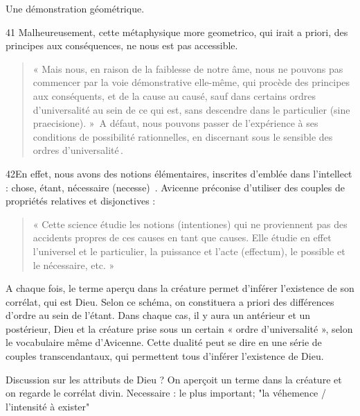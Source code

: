 \begin{Synthesis}
Une démonstration géométrique. 
\end{Synthesis}
41 Malheureusement, cette métaphysique more geometrico, qui irait a priori, des principes aux conséquences, ne nous est pas accessible.
\begin{quote}
     « Mais nous, en raison de la faiblesse de notre âme, nous ne pouvons pas commencer par la voie démonstrative elle-même, qui procède des principes aux conséquents, et de la cause au causé, sauf dans certains ordres d’universalité au sein de ce qui est, sans descendre dans le particulier (sine praecisione). »  A défaut, nous pouvons passer de l’expérience à ses conditions de possibilité rationnelles, en discernant sous le sensible des ordres d’universalité .
\end{quote}


42En effet, nous avons des notions élémentaires, inscrites d’emblée dans l’intellect : chose, étant, nécessaire (necesse)  . Avicenne préconise d’utiliser des couples de propriétés relatives et disjonctives : 
\begin{quote}
    « Cette science étudie les notions (intentiones) qui ne proviennent pas des accidents propres de ces causes en tant que causes. Elle étudie en effet l’universel et le particulier, la puissance et l’acte (effectum), le possible et le nécessaire, etc. » 
\end{quote}
 A chaque fois, le terme aperçu dans la créature permet d’inférer l’existence de son corrélat, qui est Dieu. Selon ce schéma, on constituera a priori des différences d’ordre au sein de l’étant. Dans chaque cas, il y aura un antérieur et un postérieur, Dieu et la créature prise sous un certain « ordre d’universalité », selon le vocabulaire même d’Avicenne. Cette dualité peut se dire en une série de couples transcendantaux, qui permettent tous d’inférer l’existence de Dieu. 
 \begin{Synthesis}
 Discussion sur les attributs de Dieu ? On aperçoit un terme dans la créature et on regarde le corrélat divin.
 Necessaire : le plus important; "la véhemence / l'intensité à exister"
 \end{Synthesis}
 
